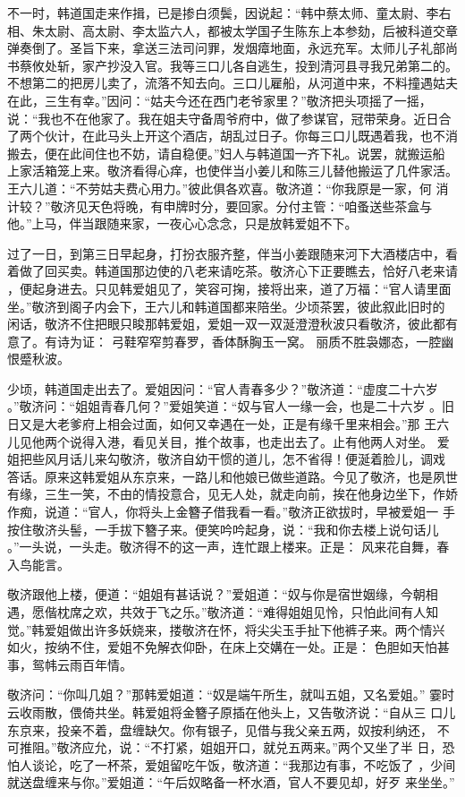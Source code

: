 不一时，韩道国走来作揖，已是掺白须鬓，因说起：“韩中蔡太师、童太尉、李右
相、朱太尉、高太尉、李太监六人，都被太学国子生陈东上本参劾，后被科道交章
弹奏倒了。圣旨下来，拿送三法司问罪，发烟瘴地面，永远充军。太师儿子礼部尚
书蔡攸处斩，家产抄没入官。我等三口儿各自逃生，投到清河县寻我兄弟第二的。
不想第二的把房儿卖了，流落不知去向。三口儿雇船，从河道中来，不料撞遇姑夫
在此，三生有幸。”因问：“姑夫今还在西门老爷家里？”敬济把头项摇了一摇，
说：“我也不在他家了。我在姐夫守备周爷府中，做了参谋官，冠带荣身。近日合
了两个伙计，在此马头上开这个酒店，胡乱过日子。你每三口儿既遇着我，也不消
搬去，便在此间住也不妨，请自稳便。”妇人与韩道国一齐下礼。说罢，就搬运船
上家活箱笼上来。敬济看得心痒，也使伴当小姜儿和陈三儿替他搬运了几件家活。
王六儿道：“不劳姑夫费心用力。”彼此俱各欢喜。敬济道：“你我原是一家，何
消计较？”敬济见天色将晚，有申牌时分，要回家。分付主管：“咱蚤送些茶盒与
他。”上马，伴当跟随来家，一夜心心念念，只是放韩爱姐不下。

过了一日，到第三日早起身，打扮衣服齐整，伴当小姜跟随来河下大酒楼店中，看
着做了回买卖。韩道国那边使的八老来请吃茶。敬济心下正要瞧去，恰好八老来请
，便起身进去。只见韩爱姐见了，笑容可掬，接将出来，道了万福：“官人请里面
坐。”敬济到阁子内会下，王六儿和韩道国都来陪坐。少顷茶罢，彼此叙此旧时的
闲话，敬济不住把眼只睃那韩爱姐，爱姐一双一双涎澄澄秋波只看敬济，彼此都有
意了。有诗为证：
弓鞋窄窄剪春罗，香体酥胸玉一窝。
丽质不胜袅娜态，一腔幽恨蹙秋波。

少顷，韩道国走出去了。爱姐因问：“官人青春多少？”敬济道：“虚度二十六岁
。”敬济问：“姐姐青春几何？”爱姐笑道：“奴与官人一缘一会，也是二十六岁
。旧日又是大老爹府上相会过面，如何又幸遇在一处，正是有缘千里来相会。”那
王六儿见他两个说得入港，看见关目，推个故事，也走出去了。止有他两人对坐。
爱姐把些风月话儿来勾敬济，敬济自幼干惯的道儿，怎不省得！便涎着脸儿，调戏
答话。原来这韩爱姐从东京来，一路儿和他娘已做些道路。今见了敬济，也是夙世
有缘，三生一笑，不由的情投意合，见无人处，就走向前，挨在他身边坐下，作娇
作痴，说道：“官人，你将头上金簪子借我看一看。”敬济正欲拔时，早被爱姐一
手按住敬济头髻，一手拔下簪子来。便笑吟吟起身，说：“我和你去楼上说句话儿
。”一头说，一头走。敬济得不的这一声，连忙跟上楼来。正是：
风来花自舞，春入鸟能言。

敬济跟他上楼，便道：“姐姐有甚话说？”爱姐道：“奴与你是宿世姻缘，今朝相
遇，愿偕枕席之欢，共效于飞之乐。”敬济道：“难得姐姐见怜，只怕此间有人知
觉。”韩爱姐做出许多妖娆来，搂敬济在怀，将尖尖玉手扯下他裤子来。两个情兴
如火，按纳不住，爱姐不免解衣仰卧，在床上交媾在一处。正是：
色胆如天怕甚事，鸳帏云雨百年情。

敬济问：“你叫几姐？”那韩爱姐道：“奴是端午所生，就叫五姐，又名爱姐。”
霎时云收雨散，偎倚共坐。韩爱姐将金簪子原插在他头上，又告敬济说：“自从三
口儿东京来，投亲不着，盘缠缺欠。你有银子，见借与我父亲五两，奴按利纳还，
不可推阻。”敬济应允，说：“不打紧，姐姐开口，就兑五两来。”两个又坐了半
日，恐怕人谈论，吃了一杯茶，爱姐留吃午饭，敬济道：“我那边有事，不吃饭了
，少间就送盘缠来与你。”爱姐道：“午后奴略备一杯水酒，官人不要见却，好歹
来坐坐。”

